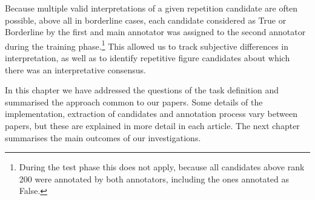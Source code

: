 Because multiple valid interpretations of a given repetition candidate are often possible, above all in borderline cases, each candidate considered as True or Borderline by the first and main annotator was assigned to the second annotator during the training phase.\footnote{During the test phase this does not apply, because all candidates above rank 200 were annotated by both annotators, including the ones annotated as False.} This allowed us to track subjective differences in interpretation, as well as to identify repetitive figure candidates about which there was an interpretative consensus.

In this chapter we have addressed the questions of the task definition and summarised the approach common to our papers. Some details of the implementation, extraction of candidates and annotation process vary between papers, but these are explained in more detail in each article. The next chapter summarises the main outcomes of our investigations.
%
%
